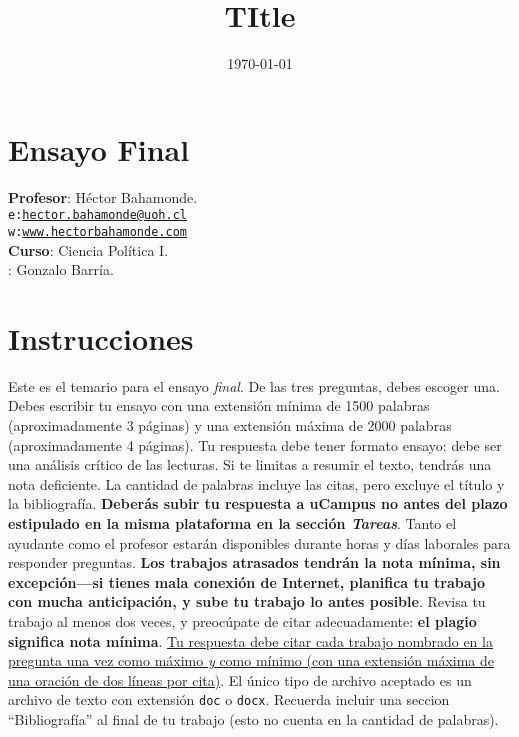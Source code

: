 \documentclass[onesided]{article}\usepackage[]{graphicx}\usepackage[]{color}
\title{TItle} %
\date{\today}
\begin{document}










\clearpage
\newpage
{}
\setcounter{page}{1}

\section{Ensayo Final}

{\bf Profesor}: H\'ector Bahamonde.\\
\texttt{e:}\href{mailto:hector.bahamonde@uoh.cl}{\texttt{hector.bahamonde@uoh.cl}}\\
\texttt{w:}\href{http://www.hectorbahamonde.com}{\texttt{www.hectorbahamonde.com}}\\
{\bf Curso}: Ciencia Pol\'itica I.\\
\hspace{-5mm}{\bf Ayudante}: Gonzalo Barr\'ia.

\section*{Instrucciones}
Este es el temario para el ensayo \emph{final}. De las tres preguntas, debes escoger una. Debes escribir tu ensayo con una extensi\'on m\'inima de 1500 palabras (aproximadamente 3 p\'aginas) y una extensi\'on m\'axima de 2000 palabras (aproximadamente 4 p\'aginas). Tu respuesta debe tener formato ensayo: debe ser una an\'alisis cr\'itico de las lecturas. Si te limitas a resumir el texto, tendr\'as una nota deficiente. La cantidad de palabras incluye las citas, pero excluye el t\'itulo y la bibliograf\'ia. {\bf Deber\'as subir tu respuesta a uCampus no antes del plazo estipulado en la misma plataforma en la secci\'on \emph{Tareas}}. Tanto el ayudante como el profesor estar\'an disponibles durante horas y d\'ias laborales para responder preguntas. {\bf Los trabajos atrasados tendr\'an la nota m\'inima, sin excepci\'on---si tienes mala conexi\'on de Internet, planifica tu trabajo con mucha anticipaci\'on, y sube tu trabajo lo antes posible}. Revisa tu trabajo al menos dos veces, y preoc\'upate de citar adecuadamente: {\bf el plagio significa nota m\'inima}. \ul{Tu respuesta debe citar cada trabajo nombrado en la pregunta una vez como m\'aximo \emph{y} como m\'inimo (con una extensi\'on m\'axima de una oraci\'on de dos l\'ineas por cita)}. El \'unico tipo de archivo aceptado es un archivo de texto con extensi\'on \texttt{doc} o \texttt{docx}. Recuerda incluir una seccion ``Bibliograf\'ia'' al final de tu trabajo (esto no cuenta en la cantidad de palabras).
\end{document}
